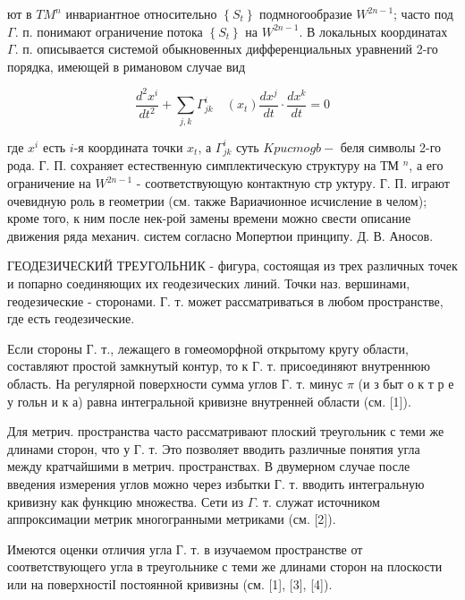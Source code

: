 \documentclass[10pt]{article}
\begin{document}
ют в $T M^{n}$ инвариантное относительно $\left\{S_{t}\right\}$ подмногообразие $W^{2 n-1}$; часто под $\Gamma$. п. понимают ограничение потока $\left\{S_{t}\right\}$ на $W^{2 n-1}$. В локальных координатах $\Gamma$. п. описывается системой обыкновенных дифференциальных уравнений 2-го порядка, имеющей в римановом случае вид



\[

\frac{d^{2} x^{i}}{d t^{2}}+\sum_{j, k} \Gamma_{j k}^{i} \quad\left(x_{t}\right) \frac{d x^{j}}{d t} \cdot \frac{d x^{k}}{d t}=0

\]



где $x^{i}$ есть $i$-я координата точки $x_{t}$, а $\Gamma_{j k}^{i}$ суть $K p u c m o g b-$ беля символы 2-го рода. Г. П. сохраняет естественную симплектическую структуру на ТМ ${ }^{n}$, а его ограничение на $W^{2 n-1}$ - соответствующую контактную стр уктуру. Г. П. играют очевидную роль в геометрии (см. также Вариачионное исчисление в челом); кроме того, к ним после нек-рой замены времени можно свести описание движения ряда механич. систем согласно Мопертюи принципу. Д. В. Аносов.



ГЕОДЕЗИЧЕСКИЙ ТРЕУГОЛЬНИК - фигура, состоящая из трех различных точек и попарно соединяющих их геодезических линий. Точки наз. вершинами, геодезические - сторонами. Г. т. может рассматриваться в любом пространстве, где есть геодезические.



Если стороны Г. т., лежащего в гомеоморфной открытому кругу области, составляют простой замкнутый контур, то к Г. т. присоединяют внутреннюю область. На регулярной поверхности сумма углов Г. т. минус $\pi$ (и з быт о к т р е у гольн и к а) равна интегральной кривизне внутренней области (см. [1]).



Для метрич. пространства часто рассматривают плоский треугольник с теми же длинами сторон, что у Г. т. Это позволяет вводить различные понятия угла между кратчайшими в метрич. пространствах. В двумерном случае после введения измерения углов можно через избытки Г. т. вводить интегральную кривизну как функцию множества. Сети из $\Gamma$. т. служат источником аппроксимации метрик многогранными метриками (см. [2]).



Имеются оценки отличия угла Г. т. в изучаемом пространстве от соответствующего угла в треугольнике с теми же длинами сторон на плоскости или на поверхностіІ постоянной кривизны (см. [1], [3], [4]).
\end{document}
